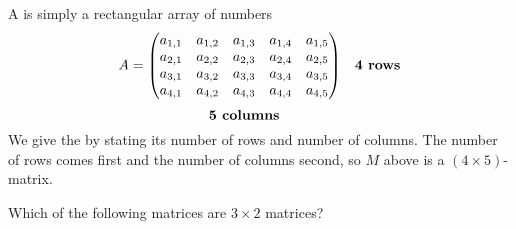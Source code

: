 \documentclass{ximera}
\begin{document}
A  is simply a rectangular array of numbers
\[
  A =
  \underset{\raisebox{-2ex}{\text{\bf 5 columns}}}{
    \begin{pmatrix}
      a_{1,1} & a_{1,2} & a_{1,3} & a_{1,4} & a_{1,5} \\
      a_{2,1} & a_{2,2} & a_{2,3} & a_{2,4} & a_{2,5} \\
      a_{3,1} & a_{3,2} & a_{3,3} & a_{3,4} & a_{3,5} \\
      a_{4,1} & a_{4,2} & a_{4,3} & a_{4,4} & a_{4,5}
    \end{pmatrix}}
  \quad\text{\bf 4 rows}
\]
We give the  by stating its number of rows
and number of columns. The number of rows comes first and the number
of columns second, so $M$ above is a $(4\times 5)$-matrix.
\begin{question}
  Which of the following matrices are $3\times 2$ matrices?
  \begin{selectAll}
\pdfOnly{\end{multicols}}
\end{selectAll}
\end{question}


\end{document}
